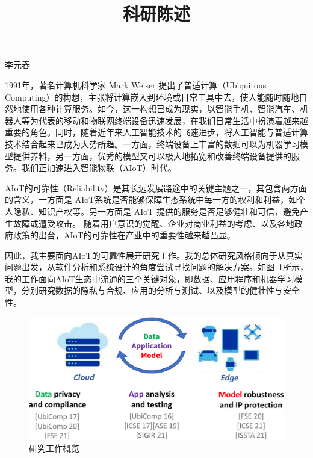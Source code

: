 \documentclass[12pt]{article}
\begin{document}

\title{科研陈述}

\maketitle


\begin{center} {李元春} \end{center}



1991年，著名计算机科学家 Mark Weiser 提出了普适计算（Ubiquitous Computing）的构想，主张将计算嵌入到环境或日常工具中去，使人能随时随地自然地使用各种计算服务。如今，这一构想已成为现实，以智能手机、智能汽车、机器人等为代表的移动和物联网终端设备迅速发展，在我们日常生活中扮演着越来越重要的角色。同时，随着近年来人工智能技术的飞速进步，将人工智能与普适计算技术结合起来已成为大势所趋。一方面，终端设备上丰富的数据可以为机器学习模型提供养料，另一方面，优秀的模型又可以极大地拓宽和改善终端设备提供的服务。我们正加速进入智能物联（AIoT）时代。

AIoT的可靠性（Reliability）是其长远发展路途中的关键主题之一，其包含两方面的含义，一方面是 AIoT系统是否能够保障生态系统中每一方的权利和利益，如个人隐私、知识产权等。另一方面是 AIoT 提供的服务是否足够健壮和可信，避免产生故障或遭受攻击。
随着用户意识的觉醒、企业对商业利益的考虑、以及各地政府政策的出台，AIoT的可靠性在产业中的重要性越来越凸显。

因此，我主要面向AIoT的可靠性展开研究工作。我的总体研究风格倾向于从真实问题出发，从软件分析和系统设计的角度尝试寻找问题的解决方案。如图~\ref{fig:overview}所示，我的工作面向AIoT生态中流通的三个关键对象，即数据、应用程序和机器学习模型，分别研究数据的隐私与合规、应用的分析与测试、以及模型的健壮性与安全性。


\begin{figure}
    \centering
    \includegraphics[width=5in]{figures/research_overview.pdf}
    \caption{研究工作概览}
    \label{fig:overview}
\end{figure}
\end{document}

